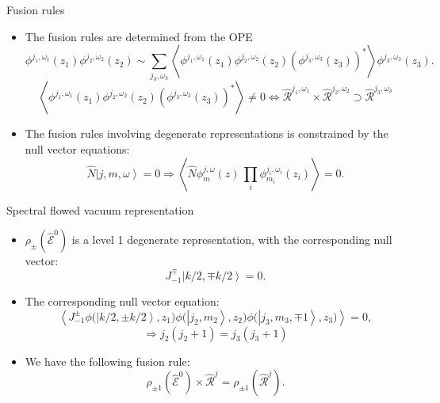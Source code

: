 \documentclass{beamer}
\newcommand{\ket}[1]{\left| #1 \right\rangle}
\newcommand{\vev}[1]{\left\langle #1 \right\rangle}
\begin{document}
\begin{frame}{Fusion rules}
  \begin{itemize}
    \item The fusion rules are determined from the OPE 
          \begin{equation*}
              \phi^{j_{1},\omega_{1}}(z_{1}) \phi^{j_{2},\omega_{2}}(z_{2}) \sim \sum_{j_{3},\omega_{3}}
              \vev{\phi^{j_{1},\omega_{1}}(z_{1}) \phi^{j_{2},\omega_{2}}(z_{2}) \left(\phi^{j_{3},\omega_{3}}(z_{3}) \right)^{*}} \phi^{j_{3},\omega_{3}}(z_{3}).
          \end{equation*}
          \begin{equation*}
            \vev{\phi^{j_{1},\omega_{1}}(z_{1}) \phi^{j_{2},\omega_{2}}(z_{2}) \left(\phi^{j_{3},\omega_{3}}(z_{3}) \right)^{*}} 
            \neq 0 \Longleftrightarrow \widehat{\mathcal{R}}^{j_{1},\omega_{1}} \times \widehat{\mathcal{R}}^{j_{2},\omega_{2}} \supset \widehat{\mathcal{R}}^{j_{3},\omega_{3}}
          \end{equation*}
    \item The fusion rules involving degenerate representations is constrained by the null vector equations:
          \begin{equation*}
            \hat{N} \ket{j,m,\omega} = 0 \Longrightarrow \vev{\hat{N} \phi^{j,\omega}_{m}(z)\, \prod_{i} \phi^{j_{i},\omega_{i}}_{m_{i}} (z_{i} )} = 0.
          \end{equation*}

  \end{itemize}
\end{frame}

\begin{frame}{Spectral flowed vacuum representation}
  \begin{itemize}
    \item $\rho_{\pm} \left(\widehat{\mathcal{E}}^{0}\right)$ is a level 1 degenerate representation, with the corresponding null vector:
      \begin{equation*}
        J^{\mp}_{-1} \ket{k/2,\mp k/2} = 0.
      \end{equation*}
    \item The corresponding null vector equation:
      \begin{equation*}
          \vev{J^{\pm}_{-1} \phi \Big(\ket{k/2,\pm k/2 },z_{1} \Big) \phi \Big(\ket{j_{2},m_{2}}, z_{2}\Big)
            \phi \Big(\ket{j_{3},m_{3}, \mp 1}, z_{3} \Big) }= 0,
      \end{equation*}
      \begin{equation*}
          \Rightarrow j_{2}(j_{2}+1) = j_{3}(j_{3}+1)
      \end{equation*}
    \item We have the following fusion rule:
      \begin{equation*}
          \rho_{\pm 1} \left( \hat{\mathcal{E}}^{0} \right) \times \widehat{\mathcal{R}}^{j} = \rho_{\pm 1} \left( \widehat{\mathcal{R}}^{j} \right).
      \end{equation*}
  \end{itemize}
\end{frame}
\end{document}
